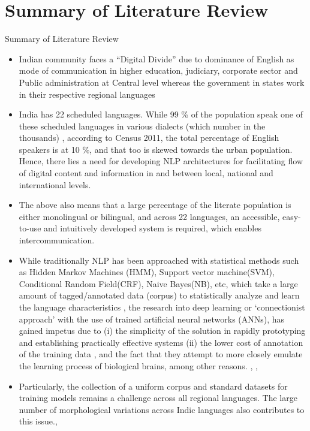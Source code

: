 \documentclass{beamer}
\begin{document}
\section{Summary of Literature Review}
\begin{frame}[allowframebreaks]{Summary of Literature Review}
\begin{itemize}
		\item Indian community faces a “Digital Divide” due to dominance of English as mode of communication in higher education, judiciary, corporate sector and Public administration at Central level whereas the government in states work in their respective regional languages \cite{kurian2008natural} 
		\item India has 22 scheduled languages. While 99 \%  of the population speak one of these scheduled languages in various dialects (which number in the thousands) \cite{theindianexpress_2018}, according to Census 2011, the total percentage of English speakers is at 10 \%, and that too is skewed towards the urban population. \cite{s_2019} Hence, there lies a need for developing NLP architectures for facilitating flow of digital content and information in and between local, national and international levels.
		\item The above also means that a large percentage of the literate population is either monolingual or bilingual, and across 22 languages, an accessible, easy-to-use and intuitively developed system is required, which enables intercommunication.
		\item While traditionally NLP has been approached with statistical methods such as Hidden Markov Machines (HMM), Support vector machine(SVM), Conditional Random Field(CRF), Naive Bayes(NB), etc, which take a large amount of tagged/annotated data (corpus) to statistically analyze and learn the language characteristics \cite{desai2021taxonomic}, the research into deep learning or ‘connectionist approach’ \cite{desai2021taxonomic} with the use of trained artificial neural networks (ANNs), has gained impetus due to (i) the simplicity of the solution in rapidly prototyping and establishing practically effective systems (ii) the lower cost of annotation of the training data \cite{philip2019baseline}, and the fact that they attempt to more closely emulate the learning process of biological brains, among other reasons. \cite{desai2021taxonomic}, \cite{rosca2016sequence}, \cite{deselaers2009deep}
		\item Particularly, the collection of a uniform corpus and standard datasets for training models remains a challenge across all regional languages. The large number of morphological variations across Indic languages also contributes to this issue.\cite{kunchukuttan2020ai4bharat}, \cite{singhnlp}

\end{itemize}
\end{frame}
\end{document}
